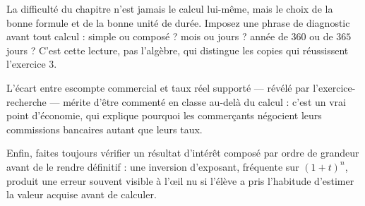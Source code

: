 \begin{notepourlaclasse}
La difficulté du chapitre n'est jamais le calcul lui-même, mais le choix de
la bonne formule et de la bonne unité de durée. Imposez une phrase de
diagnostic avant tout calcul : simple ou composé ? mois ou jours ? année de
$360$ ou de $365$ jours ? C'est cette lecture, pas l'algèbre, qui distingue
les copies qui réussissent l'exercice 3.

L'écart entre escompte commercial et taux réel supporté — révélé par
l'exercice-recherche — mérite d'être commenté en classe au-delà du calcul :
c'est un vrai point d'économie, qui explique pourquoi les commerçants
négocient leurs commissions bancaires autant que leurs taux.

Enfin, faites toujours vérifier un résultat d'intérêt composé par ordre de
grandeur avant de le rendre définitif : une inversion d'exposant, fréquente
sur $(1+t)^{n}$, produit une erreur souvent visible à l'œil nu si l'élève a
pris l'habitude d'estimer la valeur acquise avant de calculer.
\end{notepourlaclasse}
